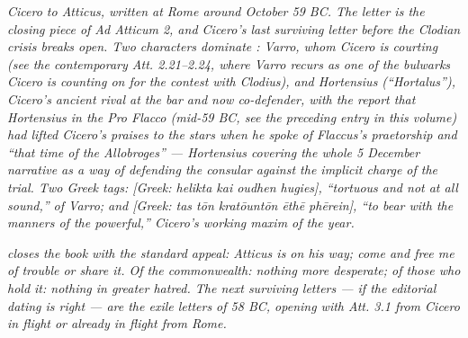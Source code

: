 
\textit{Cicero to Atticus, written at Rome around October 59
BC. The letter is the closing piece of \textit{Ad Atticum} 2,
and Cicero's last surviving letter before the Clodian crisis
breaks open. Two characters dominate : Varro,
whom Cicero is courting (see the contemporary \textit{Att.}
2.21--2.24, where Varro recurs as one of the bulwarks Cicero
is counting on for the contest with Clodius), and Hortensius
(``Hortalus''), Cicero's ancient rival at the bar and now
co-defender, with the report that Hortensius in the
\textit{Pro Flacco} (mid-59 BC, see the preceding entry in
this volume) had lifted Cicero's praises to the stars when he
spoke of Flaccus's praetorship and ``that time of the
Allobroges'' --- Hortensius covering the whole 5 December
narrative as a way of defending the consular against the
implicit charge of the trial. Two Greek tags: \textit{[Greek:
helikta kai oudhen hugies]}, ``tortuous and not at all sound,''
of Varro; and \textit{[Greek: tas t\=on krat\=ount\=on
\=eth\=e ph\=erein]}, ``to bear with the manners of the
powerful,'' Cicero's working maxim of the year.}

\textit{ closes the book with the standard
appeal: Atticus is on his way; come and free me of trouble or
share it. Of the commonwealth: nothing more desperate; of
those who hold it: nothing in greater hatred. The next
surviving letters --- if the editorial dating is right ---
are the exile letters of 58 BC, opening with \textit{Att.}
3.1 from Cicero in flight or already in flight from Rome.}
